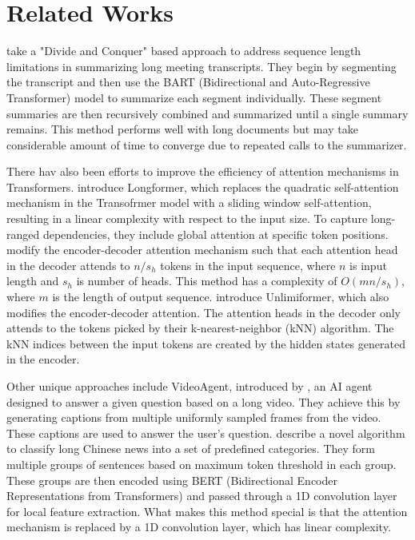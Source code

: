 \section{Related Works}

\citet{10.1145/3639233.3639253} take a "Divide and Conquer" based approach to address
sequence length limitations in summarizing long meeting transcripts.
They begin by segmenting the transcript and then use the BART (Bidirectional and
Auto-Regressive Transformer) model to summarize each segment individually.
These segment summaries are then recursively combined and summarized until a single
summary remains.
This method performs well with long documents but may take considerable amount of time
to converge due to repeated calls to the summarizer.

There hav also been efforts to improve the efficiency of attention mechanisms in Transformers.
\citet{beltagy2020longformer} introduce Longformer, which replaces the quadratic
self-attention mechanism in the Transofrmer model with a sliding window self-attention,
resulting in a linear complexity with respect to the input size.
To capture long-ranged dependencies, they include global attention at specific token positions.
\citet{huang-etal-2021-efficient} modify the encoder-decoder attention mechanism such that
each attention head in the decoder attends to $n/s_h$ tokens in the input sequence, where
$n$ is input length and $s_h$ is number of heads.
This method has a complexity of $O(mn/s_h)$, where $m$ is the length of output sequence.
\citet{NEURIPS2023_6f9806a5} introduce Unlimiformer, which also modifies the encoder-decoder
attention.
The attention heads in the decoder only attends to the tokens picked by their
k-nearest-neighbor (kNN) algorithm.
The kNN indices between the input tokens are created by the hidden states generated in the
encoder.

Other unique approaches include VideoAgent, introduced by \citet{wang2024videoagent}, an
AI agent designed to answer a given question based on a long video.
They achieve this by generating captions from multiple uniformly sampled frames from the
video.
These captions are used to answer the user's question.
\citet{chen2022long} describe a novel algorithm to classify long Chinese news into a set
of predefined categories.
They form multiple groups of sentences based on maximum token threshold in each group.
These groups are then encoded using BERT (Bidirectional Encoder Representations from
Transformers) and passed through a 1D convolution layer for local feature extraction.
What makes this method special is that the attention mechanism is replaced by a 1D
convolution layer, which has linear complexity.
